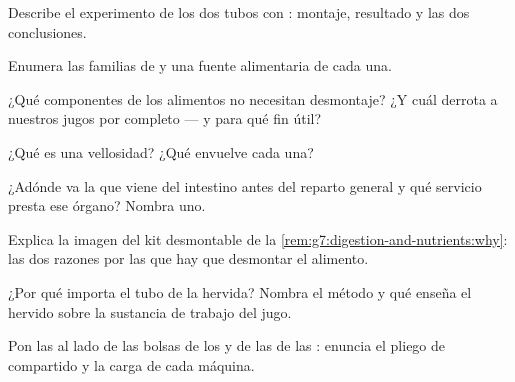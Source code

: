 \begin{exercise}[$\star$]\label{exo:g7:digestion-and-nutrients:2}
Describe el experimento de los dos tubos con : montaje, resultado
y las dos conclusiones.
\end{exercise}

\begin{exercise}[$\star$]\label{exo:g7:digestion-and-nutrients:3}
Enumera las familias de  y una fuente alimentaria de cada una.
\end{exercise}

\begin{exercise}[$\star$]\label{exo:g7:digestion-and-nutrients:4}
¿Qué componentes de los alimentos no necesitan desmontaje? ¿Y cuál
derrota a nuestros jugos por completo --- y para qué fin útil?
\end{exercise}

\begin{exercise}[$\star$]\label{exo:g7:digestion-and-nutrients:5}
¿Qué es una vellosidad? ¿Qué envuelve cada una?
\end{exercise}

\begin{exercise}[$\star$]\label{exo:g7:digestion-and-nutrients:6}
¿Adónde va la  que viene del intestino antes del reparto general
y qué servicio presta ese órgano? Nombra uno.
\end{exercise}

\begin{exercise}[$\star\star$]\label{exo:g7:digestion-and-nutrients:7}
Explica la imagen del kit desmontable de la
\cref{rem:g7:digestion-and-nutrients:why}: las dos razones por las que
hay que desmontar el alimento.
\end{exercise}

\begin{exercise}[$\star\star$]\label{exo:g7:digestion-and-nutrients:8}
¿Por qué importa el tubo de la  hervida? Nombra el método y qué
enseña el hervido sobre la sustancia de trabajo del jugo.
\end{exercise}

\begin{exercise}[$\star\star$]\label{exo:g7:digestion-and-nutrients:9}
Pon las  al lado de las bolsas de los  y de las
 de las : enuncia el pliego de  compartido y
la carga de cada máquina.
\end{exercise}

